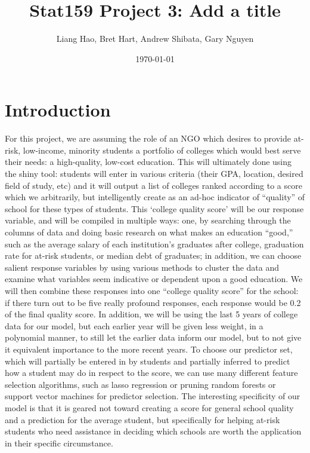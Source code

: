 \documentclass{article}\usepackage[]{graphicx}\usepackage[]{color}
\title{Stat159 Project 3: Add a title}
\author{Liang Hao, Bret Hart, Andrew Shibata, Gary Nguyen}
\date{\today}
\begin{document}
\maketitle
\section{Introduction}

For this project, we are assuming the role of an NGO which desires to provide at-risk, low-income, minority students a portfolio of colleges which would best serve their needs: a high-quality, low-cost education. This will ultimately done using the shiny tool: students will enter in various criteria (their GPA, location, desired field of study, etc) and it will output a list of colleges ranked according to a score which we arbitrarily, but intelligently create as an ad-hoc indicator of “quality” of school for these types of students. This ‘college quality score’ will be our response variable, and will be compiled in multiple ways: one, by searching through the columns of data and doing basic research on what makes an education “good,” such as the average salary of each institution’s graduates after college, graduation rate for at-risk students, or median debt of graduates; in addition, we can choose salient response variables by using various methods to cluster the data and examine what variables seem indicative or dependent upon a good education. We will then combine these responses into one “college quality score” for the school: if there turn out to be five really profound responses, each response would be 0.2 of the final quality score. In addition, we will be using the last 5 years of college data for our model, but each earlier year will be given less weight, in a polynomial manner, to still let the earlier data inform our model, but to not give it equivalent importance to the more recent years. To choose our predictor set, which will partially be entered in by students and partially inferred to predict how a student may do in respect to the score, we can use many different feature selection algorithms, such as lasso regression or pruning random forests or support vector machines for predictor selection. The interesting specificity of our model is that it is geared not toward creating a score for general school quality and a prediction for the average student, but specifically for helping at-risk students who need assistance in deciding which schools are worth the application in their specific circumstance.
\end{document}
